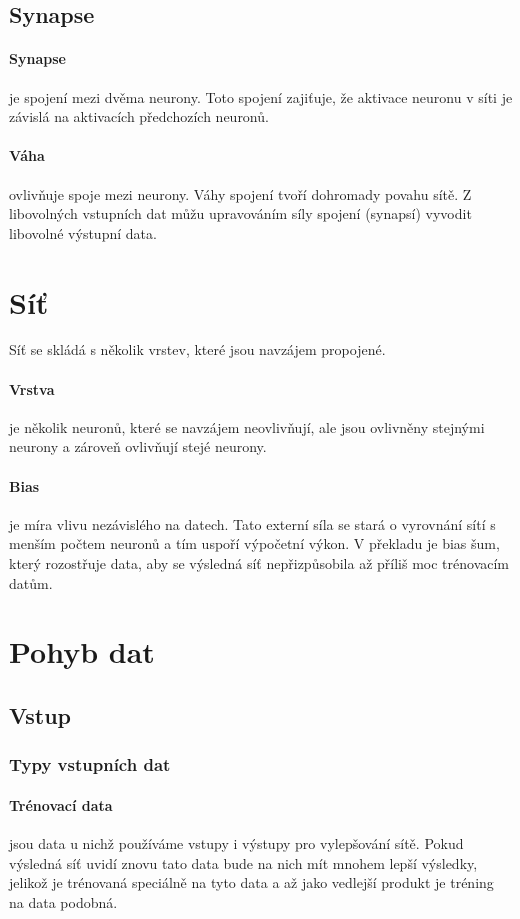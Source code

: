 \documentclass[12pt,a4paper]{report}
\begin{document}
	\subsection{Synapse}
		\paragraph{Synapse} je spojení mezi dvěma neurony. Toto spojení zajiťuje, že aktivace neuronu v síti je závislá na aktivacích předchozích neuronů.
		\paragraph{Váha}
		ovlivňuje spoje mezi neurony. Váhy spojení tvoří dohromady povahu sítě. Z libovolných vstupních dat můžu upravováním síly spojení (synapsí) vyvodit libovolné výstupní data. 
\section{Síť}
	Síť se skládá s několik vrstev, které jsou navzájem propojené.
	\paragraph{Vrstva}
	je několik neuronů, které se navzájem neovlivňují, ale jsou ovlivněny stejnými neurony a zároveň ovlivňují stejé neurony.
	\paragraph{Bias}
	je míra vlivu nezávislého na datech. Tato externí síla se stará o vyrovnání sítí s menším počtem neuronů a tím uspoří výpočetní výkon. V překladu je bias šum, který rozostřuje data, aby se výsledná síť nepřizpůsobila až příliš moc trénovacím datům.
		
\section{Pohyb dat}
	\subsection{Vstup}
		\subsubsection{Typy vstupních dat}
			\paragraph{Trénovací data}
			jsou data u nichž používáme vstupy i výstupy pro vylepšování sítě. Pokud výsledná síť uvidí znovu tato data bude na nich mít mnohem lepší výsledky, jelikož je trénovaná speciálně na tyto data a až jako vedlejší produkt je tréning na data podobná.
\end{document}
